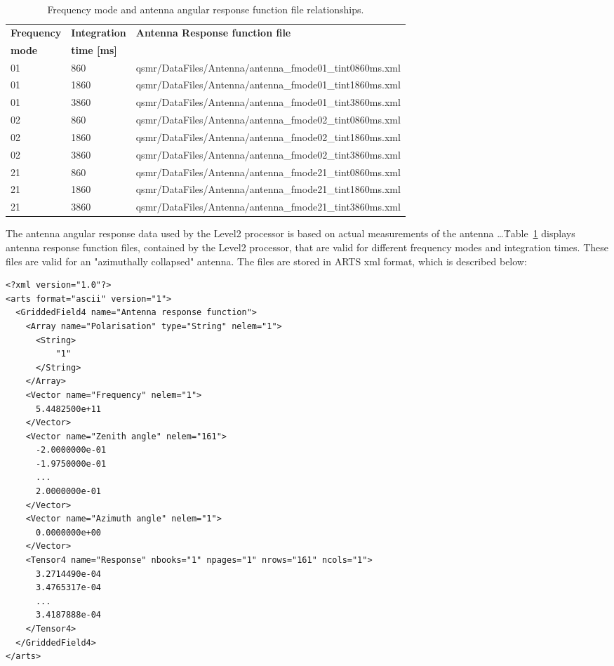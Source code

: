 \begin{table}
\caption{ Frequency mode and antenna angular response function file relationships.}
\label{table:antenna}
\begin{tabular}{|l|l|l|}
\hline
\textbf{Frequency} & \textbf{Integration} & \textbf{Antenna Response function file} \\
\textbf{mode} & \textbf{time [ms]} &  \\
\hline
  01 & 860  & qsmr/DataFiles/Antenna/antenna\_fmode01\_tint0860ms.xml \\ \hline                                                                      
  01 & 1860 & qsmr/DataFiles/Antenna/antenna\_fmode01\_tint1860ms.xml \\ \hline                                                               
  01 & 3860 & qsmr/DataFiles/Antenna/antenna\_fmode01\_tint3860ms.xml \\ \hline                                                                
  02 & 860  & qsmr/DataFiles/Antenna/antenna\_fmode02\_tint0860ms.xml \\ \hline                                        
  02 & 1860 & qsmr/DataFiles/Antenna/antenna\_fmode02\_tint1860ms.xml \\ \hline                                
  02 & 3860 & qsmr/DataFiles/Antenna/antenna\_fmode02\_tint3860ms.xml \\ \hline                                
  21 & 860  & qsmr/DataFiles/Antenna/antenna\_fmode21\_tint0860ms.xml \\ \hline       
  21 & 1860 & qsmr/DataFiles/Antenna/antenna\_fmode21\_tint1860ms.xml \\ \hline
  21 & 3860 & qsmr/DataFiles/Antenna/antenna\_fmode21\_tint3860ms.xml \\ \hline
\end{tabular}
\end{table}

The antenna angular response data used by the Level2 processor
is based on actual measurements of the antenna \dots{}\.
Table~\ref{table:antenna} displays antenna response function files,
contained by the Level2 processor,
that are valid for different frequency modes and integration 
times. These files are valid for an "azimuthally collapsed" 
antenna. The files are stored in ARTS xml format, which is
described below:

\lstset{language=XML}
\begin{lstlisting}
<?xml version="1.0"?>
<arts format="ascii" version="1">
  <GriddedField4 name="Antenna response function">
    <Array name="Polarisation" type="String" nelem="1">
      <String>
          "1"
      </String>
    </Array>
    <Vector name="Frequency" nelem="1">
      5.4482500e+11
    </Vector>
    <Vector name="Zenith angle" nelem="161">
      -2.0000000e-01
      -1.9750000e-01
      ...
      2.0000000e-01
    </Vector>
    <Vector name="Azimuth angle" nelem="1">
      0.0000000e+00
    </Vector>
    <Tensor4 name="Response" nbooks="1" npages="1" nrows="161" ncols="1">
      3.2714490e-04
      3.4765317e-04 
      ...
      3.4187888e-04 
    </Tensor4>
  </GriddedField4>
</arts>
\end{lstlisting}

